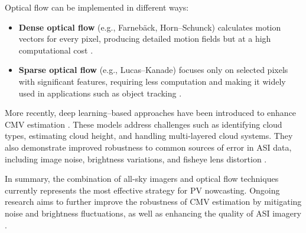 Optical flow can be implemented in different ways:

\begin{itemize}

\item \textbf{Dense optical flow} (e.g., Farnebäck, Horn--Schunck) calculates motion vectors for every pixel, producing detailed motion fields but at a high computational cost \cite{farneback2003two,horn1981determining}.

\item \textbf{Sparse optical flow} (e.g., Lucas--Kanade) focuses only on selected pixels with significant features, requiring less computation and making it widely used in applications such as object tracking \cite{lucas1981iterative}.

\end{itemize}

More recently, deep learning--based approaches have been introduced to enhance CMV estimation \cite{doshi2022}. These models address challenges such as identifying cloud types, estimating cloud height, and handling multi-layered cloud systems. They also demonstrate improved robustness to common sources of error in ASI data, including image noise, brightness variations, and fisheye lens distortion \cite{shi2015,nie2024}.

In summary, the combination of all-sky imagers and optical flow techniques currently represents the most effective strategy for PV nowcasting. Ongoing research aims to further improve the robustness of CMV estimation by mitigating noise and brightness fluctuations, as well as enhancing the quality of ASI imagery \cite{jung2020}.
